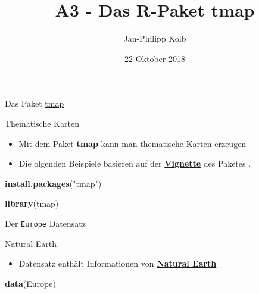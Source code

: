 \documentclass[ignorenonframetext,]{beamer}
\title{A3 - Das R-Paket tmap}
\author{Jan-Philipp Kolb}
\date{22 Oktober 2018}
\newenvironment{Shaded}{\begin{snugshade}}{\end{snugshade}}
\newcommand{\KeywordTok}[1]{\textcolor[rgb]{0.13,0.29,0.53}{\textbf{#1}}}
\newcommand{\StringTok}[1]{\textcolor[rgb]{0.31,0.60,0.02}{#1}}
\newcommand{\NormalTok}[1]{#1}
\providecommand{\tightlist}{%
  \setlength{\itemsep}{0pt}\setlength{\parskip}{0pt}}
\begin{document}
\frame{\titlepage}

\begin{frame}[fragile]{Das Paket
\href{https://cran.r-project.org/web/packages/tmap/index.html}{tmap}}

\begin{block}{Thematische Karten}

\begin{itemize}
\tightlist
\item
  Mit dem Paket
  \href{http://twitter.com/sharon000/status/593028906820599808/photo/1?ref_src=twsrc\%5Etfw}{\textbf{tmap}}
  kann man thematische Karten erzeugen
\item
  Die olgenden Beispiele basieren auf der
  \href{https://cran.r-project.org/web/packages/tmap/vignettes/tmap-nutshell.html}{\textbf{Vignette}}
  des Paketes .
\end{itemize}

\begin{Shaded}
\begin{Highlighting}[]
\KeywordTok{install.packages}\NormalTok{(}\StringTok{"tmap"}\NormalTok{)}
\end{Highlighting}
\end{Shaded}

\begin{Shaded}
\begin{Highlighting}[]
\KeywordTok{library}\NormalTok{(tmap)}
\end{Highlighting}
\end{Shaded}

\end{block}

\end{frame}

\begin{frame}[fragile]{Der \texttt{Europe} Datensatz}

\begin{block}{Natural Earth}

\begin{itemize}
\tightlist
\item
  Datensatz enthält Informationen von
  \href{http://www.naturalearthdata.com/}{\textbf{Natural Earth}}
\end{itemize}

\begin{Shaded}
\begin{Highlighting}[]
\KeywordTok{data}\NormalTok{(Europe)}
\end{Highlighting}
\end{Shaded}

\end{block}

\end{frame}
\end{document}
